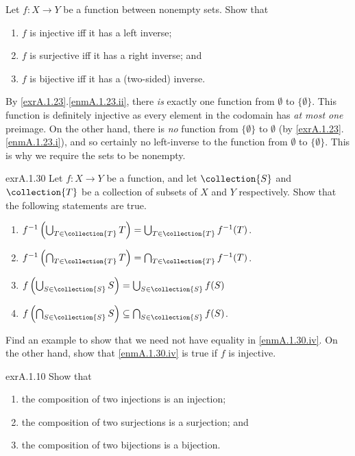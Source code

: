 \begin{exr}{}{}
Let $f\colon X\rightarrow Y$ be a function between nonempty sets.  Show that
\begin{enumerate}\label{exrA.1.9}
\item \label{enmA.1.9.i}$f$ is injective iff it has a left inverse;
\item \label{enmA.1.9.ii}$f$ is surjective iff it has a right inverse; and
\item \label{enmA.1.9.iii}$f$ is bijective iff it has a (two-sided) inverse.
\end{enumerate}
\begin{rmk}
By \cref{exrA.1.23}.\cref{enmA.1.23.ii}, there \emph{is} exactly one function from $\emptyset$ to $\{ \emptyset \}$.  This function is definitely injective as every element in the codomain has \emph{at most one} preimage.  On the other hand, there is \emph{no} function from $\{ \emptyset \}$ to $\emptyset$ (by \cref{exrA.1.23}.\cref{enmA.1.23.i}), and so certainly no left-inverse to the function from $\emptyset$ to $\{ \emptyset \}$.  This is why we require the sets to be nonempty.
\end{rmk}
\end{exr}
\begin{exr}{}{exrA.1.30}
Let $f\colon X\rightarrow Y$ be a function, and let $\collection{S}$ and $\collection{T}$ be a collection of subsets of $X$ and $Y$ respectively.  Show that the following statements are true.
\begin{enumerate}
\item \label{enmA.1.30.i}$f^{-1}\left( \bigcup _{T\in \collection{T}}T\right) =\bigcup _{T\in \collection{T}}f^{-1}(T)$.
\item \label{enmA.1.30.ii}$f^{-1}\left( \bigcap _{T\in \collection{T}}T\right) =\bigcap _{T\in \collection{T}}f^{-1}(T)$.
\item \label{enmA.1.30.iii}$f\left( \bigcup _{S\in \collection{S}}S\right) =\bigcup _{S\in \collection{S}}f(S)$
\item \label{enmA.1.30.iv}$f\left( \bigcap _{S\in \collection{S}}S\right) \subseteq \bigcap _{S\in \collection{S}}f(S)$.
\end{enumerate}
Find an example to show that we need not have equality in \cref{enmA.1.30.iv}.  On the other hand, show that \cref{enmA.1.30.iv} is true if $f$ is injective.
\end{exr}
\begin{exr}{}{exrA.1.10}
Show that
\begin{enumerate}
\item the composition of two injections is an injection;
\item the composition of two surjections is a surjection; and
\item the composition of two bijections is a bijection.
\end{enumerate}
\end{exr}
